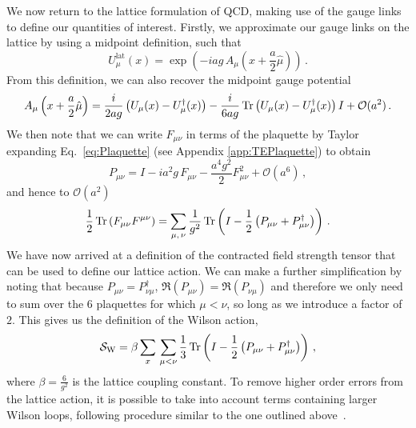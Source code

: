 We now return to the lattice formulation of QCD, making use of the gauge links to define our quantities of interest. Firstly, we approximate our gauge links on the lattice by using a midpoint definition, such that
\begin{equation}
U_\mu^\text{lat}(x) = \exp\left(-iag\, A_\mu\left(x+\frac{a}{2}\hat{\mu}\right)\right)\, .
\label{eq:GaugeLinkLat}
\end{equation}
From this definition, we can also recover the midpoint gauge potential~\cite{Leinweber:1998im,Alles:1996ka}
\begin{equation}
A_\mu\left(x+\frac{a}{2}\hat{\mu}\right) = \frac{i}{2ag}\left(U_\mu(x) - U_\mu^\dag(x)\right) - \frac{i}{6ag}\operatorname{Tr}\left(U_\mu(x) - U_\mu^\dag(x)\right)I + \mathcal{O}(a^2)\, .
\label{eq:GaugePotentialLat}
\end{equation}
We then note that we can write $F_{\mu\nu}$ in terms of the plaquette by Taylor expanding Eq.~\ref{eq:Plaquette} (see Appendix \ref{app:TEPlaquette}) to obtain~\cite{Gupta:1997nd}
%
\begin{equation}
P_{\mu\nu} = I-ia^2g\, F_{\mu\nu} - \frac{a^4 g^2}{2}F^2_{\mu\nu} +\mathcal{O}(a^6)\, ,
\label{eq:PlaquetteExpansion}
\end{equation} 
%
and hence to $\mathcal{O}(a^2)$
%
\begin{align}
\frac{1}{2}\operatorname{Tr}\left(F_{\mu\nu}F^{\mu\nu}\right) = \sum_{\mu,\,\nu}\frac{1}{g^2}\operatorname{Tr}\left(I-\frac{1}{2}\left(P_{\mu\nu}+P_{\mu\nu}^\dag\right)\right)\, .
\label{eq:FieldStrengthPlaquette}
\end{align}
%
We have now arrived at a definition of the contracted field strength tensor that can be used to define our lattice action. We can make a further simplification by noting that because $P_{\mu\nu}=P_{\nu\mu}^\dagger$, $\Re(P_{\mu\nu}) = \Re(P_{\nu\mu})$ and therefore we only need to sum over the 6 plaquettes for which $\mu<\nu$, so long as we introduce a factor of $2$. This gives us the definition of the Wilson action, 
%
\begin{equation}
\mathcal{S}_\text{W} = \beta\sum_x\,\sum_{\mu<\nu} \frac{1}{3}\operatorname{Tr}\left(I-\frac{1}{2}\left(P_{\mu\nu}+P_{\mu\nu}^\dag\right)\right)\, ,
\label{eq:WilsonAction}
\end{equation}
%
where $\beta = \frac{6}{g^2}$ is the lattice coupling constant. To remove higher order errors from the lattice action, it is possible to take into account terms containing larger Wilson loops, following procedure similar to the one outlined above~\cite{Alford:1995hw,Symanzik:1983dc,Symanzik:1983gh}.\\

